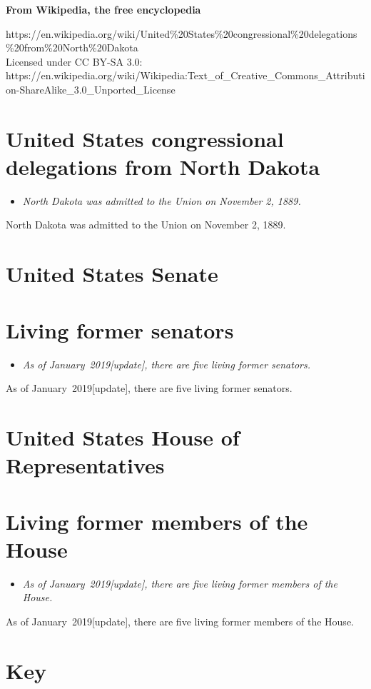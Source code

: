 \textbf{From Wikipedia, the free encyclopedia}

https://en.wikipedia.org/wiki/United\%20States\%20congressional\%20delegations\%20from\%20North\%20Dakota\\
Licensed under CC BY-SA 3.0:\\
https://en.wikipedia.org/wiki/Wikipedia:Text\_of\_Creative\_Commons\_Attribution-ShareAlike\_3.0\_Unported\_License

\section{United States congressional delegations from North
Dakota}\label{united-states-congressional-delegations-from-north-dakota}

\begin{itemize}
\item
  \emph{North Dakota was admitted to the Union on November 2, 1889.}
\end{itemize}

North Dakota was admitted to the Union on November 2, 1889.

\section{United States Senate}\label{united-states-senate}

\section{Living former senators}\label{living-former-senators}

\begin{itemize}
\item
  \emph{As of January~2019{[}update{]}, there are five living former
  senators.}
\end{itemize}

As of January~2019{[}update{]}, there are five living former senators.

\section{United States House of
Representatives}\label{united-states-house-of-representatives}

\section{Living former members of the
House}\label{living-former-members-of-the-house}

\begin{itemize}
\item
  \emph{As of January~2019{[}update{]}, there are five living former
  members of the House.}
\end{itemize}

As of January~2019{[}update{]}, there are five living former members of
the House.

\section{Key}\label{key}

